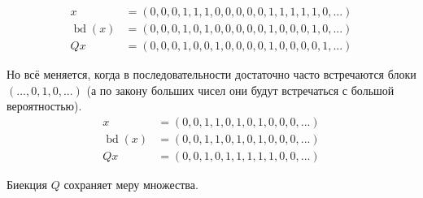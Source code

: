 \begin{example}
	\begin{equation}
		\begin{array}{rl}
			                   x &= (0,0,0,1,1,1,0,0,0,0,0,1,1,1,1,1,0,...)
			\\
			\operatorname{bd}(x) &= (0,0,0,1,0,1,0,0,0,0,0,1,0,0,0,1,0,...)
			\\
			                  Qx &= (0,0,0,1,0,0,1,0,0,0,0,1,0,0,0,0,1,...)
		\end{array}
	\end{equation}
\end{example}

\begin{example}
	Но всё меняется, когда в последовательности достаточно часто встречаются блоки $(...,0,1,0,...)$
	(а по закону больших чисел они будут встречаться с большой вероятностью).
	\begin{equation}
		\begin{array}{rl}
			                   x &= (0,0,1,1,0,1,0,1,0,0,0,...)
			\\
			\operatorname{bd}(x) &= (0,0,1,1,0,1,0,1,0,0,0,...)
			\\
			                  Qx &= (0,0,1,0,1,1,1,1,1,0,0,...)
		\end{array}
	\end{equation}
\end{example}


\begin{lemma}
	Биекция $Q$ сохраняет меру множества.
\end{lemma}

